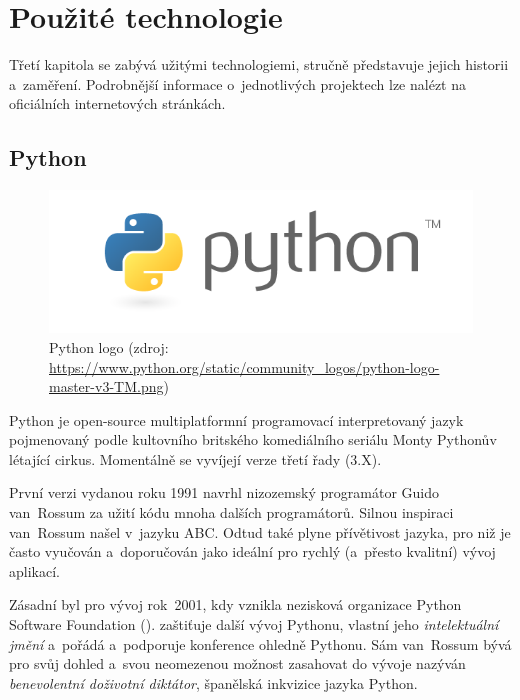 \chapter{Použité technologie}
\label{3-technologie}

Třetí kapitola se zabývá užitými technologiemi, stručně představuje jejich historii a~zaměření.
Podrobnější informace o~jednotlivých projektech lze nalézt na oficiálních internetových stránkách. 


\section{Python}
\label{python}

  \begin{figure}[H]
   \centering
	\includegraphics[scale=0.5]{./pictures/python-logo-master-v3-TM.png}
	\caption[Python logo]{Python logo 
      (zdroj: \url{https://www.python.org/static/community_logos/python-logo-master-v3-TM.png})}
      \label{fig:python}
  \end{figure}

Python je open-source multiplatformní programovací interpretovaný jazyk pojme\-novaný podle
kultovního britského komediálního seriálu Monty Pythonův létající cirkus. Momentálně se
vyvíjejí verze třetí řady (3.X). 

První verzi vydanou roku 1991 navrhl nizozemský programátor Guido van~Rossum za užití kódu
mnoha dalších programátorů. Silnou inspiraci van~Rossum našel v~jazyku ABC. Odtud také plyne
přívětivost jazyka, pro niž je často vyučován a~doporučován jako ideální pro rychlý
(a~přesto kvalitní) vývoj aplikací. 

Zásadní byl pro vývoj rok~2001, kdy vznikla nezisková organizace Python Software
Foundation ().  zaštiťuje další vývoj Pythonu, vlastní jeho
\textit{intelektuální jmění} a~pořádá a~podporuje konference ohledně Pythonu. Sám van~Rossum bývá
pro svůj dohled a~svou neomezenou možnost zasahovat do vývoje nazýván \textit{benevolentní doživotní
diktátor}, španělská inkvizice jazyka Python. 

